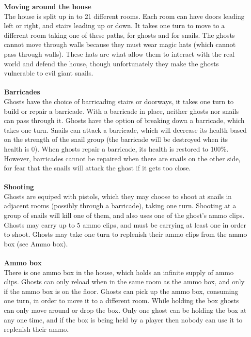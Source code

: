 \documentclass{article}
\begin{document}
\textbf{Moving around the house} \\ 
The house is split up in to 21 different rooms. Each room can have doors leading left or right, and stairs leading up or down. It takes one turn to move to a different room taking one of these paths, for ghosts and for snails. The ghosts cannot move through walls because they must wear magic hats (which cannot pass through walls). These hats are what allow them to interact with the real world and defend the house, though unfortunately they make the ghosts vulnerable to evil giant snails.\\ \\
\textbf{Barricades} \\
Ghosts have the choice of barricading stairs or doorways, it takes one turn to build or repair a barricade. With a barricade in place, neither ghosts nor snails can pass through it. Ghosts have the option of breaking down a barricade, which takes one turn. Snails can attack a barricade, which will decrease its health based on the strength of the snail group (the barricade will be destroyed when its health is 0). When ghosts repair a barricade, its health is restored to 100\%. However, barricades cannot be repaired when there are snails on the other side, for fear that the snails will attack the ghost if it gets too close. \\ \\
\textbf{Shooting} \\
Ghosts are equiped with pistols, which they may choose to shoot at snails in adjacent rooms (possibly through a barricade), taking one turn. Shooting at a group of snails will kill one of them, and also uses one of the ghost's ammo clips. Ghosts may carry up to 5 ammo clips, and must be carrying at least one in order to shoot. Ghosts may take one turn to replenish their ammo clips from the ammo box (see Ammo box). \\ \\

\textbf{Ammo box} \\
There is one ammo box in the house, which holds an infinite supply of ammo clips. Ghosts can only reload when in the same room as the ammo box, and only if the ammo box is on the floor. Ghosts can pick up the ammo box, consuming one turn, in order to move it to a different room. While holding the box ghosts can only move around or drop the box. Only one ghost can be holding the box at any one time, and if the box is being held by a player then nobody can use it to replenish their ammo. \\ \\
\end{document}
